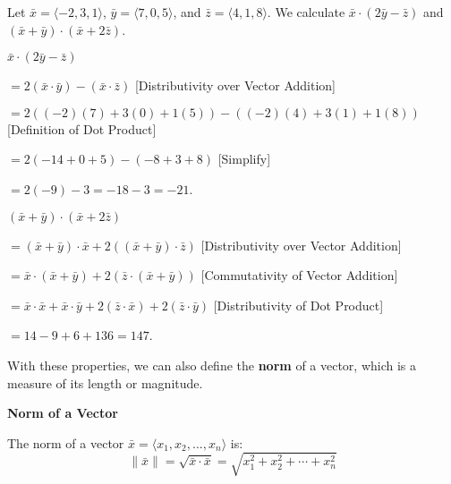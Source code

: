 \begin{examplebox}
Let $\bar{x} = \langle -2,3,1 \rangle$, $\bar{y} = \langle 7,0,5 \rangle$, and $\bar{z} = \langle 4,1,8 \rangle$. We calculate
$\bar{x} \cdot (2\bar{y} - \bar{z})$ and $(\bar{x} + \bar{y}) \cdot (\bar{x} + 2\bar{z})$.

\smallskip

\quad $\bar{x} \cdot (2\bar{y} - \bar{z})$ 

\quad $= 2(\bar{x} \cdot \bar{y}) - (\bar{x} \cdot \bar{z})$ \hfill [Distributivity over Vector Addition]

\quad $= 2((-2)(7) + 3(0) + 1(5)) - ((-2)(4) + 3(1) + 1(8))$ \hfill [Definition of Dot Product]

\quad $= 2(-14 + 0 + 5) - (-8 + 3 + 8)$ \hfill [Simplify]

\quad $= 2(-9) - 3 = -18 - 3 = -21$.

\vspace{1em}

\quad $(\bar{x} + \bar{y}) \cdot (\bar{x} + 2\bar{z})$

\quad $= (\bar{x} + \bar{y}) \cdot \bar{x} + 2((\bar{x} + \bar{y}) \cdot \bar{z})$ \hfill [Distributivity over Vector Addition] 

\quad $= \bar{x} \cdot (\bar{x} + \bar{y}) + 2(\bar{z} \cdot (\bar{x} + \bar{y}))$ \hfill [Commutativity of Vector Addition]

\quad $= \bar{x} \cdot \bar{x} + \bar{x} \cdot \bar{y} + 2(\bar{z} \cdot \bar{x}) + 2(\bar{z} \cdot \bar{y})$ \hfill [Distributivity of Dot Product]

\quad $=14 - 9 + 6 + 136 = 147$.

\end{examplebox}

With these properties, we can also define the \textbf{norm} of a vector, 
which is a measure of its length or magnitude.
\begin{definitionbox}
\textbf{Norm of a Vector}

The norm of a vector $\bar{x} = \langle x_1, x_2, ..., x_n \rangle$ is:
\[
\|\bar{x}\| = \sqrt{\bar{x} \cdot \bar{x}} = \sqrt{x_1^2 + x_2^2 + \cdots + x_n^2}
\]
\end{definitionbox}

